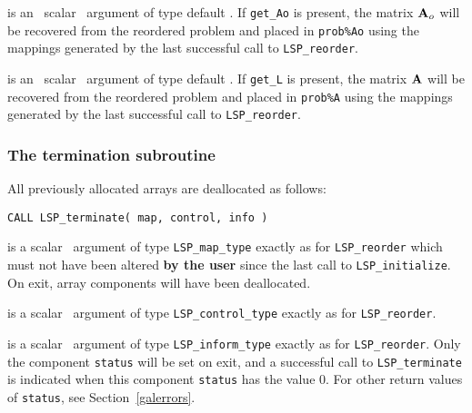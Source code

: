 \documentclass{galahad}
\newcommand{\packagename}{LSP}
\begin{document}
\begin{description}
is an \optional\ scalar \intentin\ argument of type default \logical. 
If {\tt get\_Ao} is present, the matrix ${\mathbf{A}}_o$
will be recovered from the reordered problem and placed in {\tt prob\%Ao} 
using the mappings generated by the last successful call to 
{\tt \packagename\_reorder}. 
 
is an \optional\ scalar \intentin\ argument of type default \logical. 
If {\tt get\_L} is present, the matrix ${\mathbf{A}}$
will be recovered from the reordered problem and placed in {\tt prob\%A} 
using the mappings generated by the last successful call to 
{\tt \packagename\_reorder}. 

\end{description}


\subsubsection{The  termination subroutine}
All previously allocated arrays are deallocated as follows:
\vspace*{1mm}

\hspace{8mm}
{\tt CALL \packagename\_terminate( map, control, info )}

\vspace*{-3mm}
\begin{description}

 is a scalar \intentinout\ argument of type 
{\tt \packagename\_map\_type} 
exactly as for 
{\tt \packagename\_reorder}
which must not have been altered {\bf by the user} since the last call to 
{\tt \packagename\_initialize}.
On exit, array components will have been deallocated.

 is a scalar \intentin\ argument of type 
{\tt \packagename\_control\_type}
exactly as for
{\tt \packagename\_reorder}.

 is a scalar \intentout\ argument of type 
{\tt \packagename\_inform\_type}
exactly as for
{\tt \packagename\_reorder}.
Only the component {\tt status} will be set on exit, and a 
successful call to 
{\tt \packagename\_terminate}
is indicated when this  component {\tt status} has the value 0. 
For other return values of {\tt status}, see Section~\ref{galerrors}.

\end{description}

\end{document}
